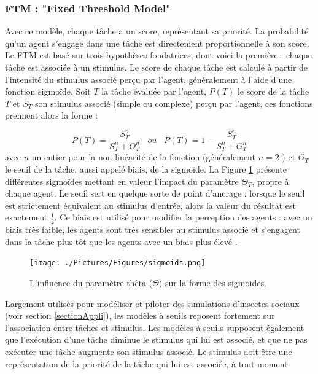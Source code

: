 		\subsubsection{FTM : "Fixed Threshold Model" \cite{bonabeau_natural_1999}}
        Avec ce modèle, chaque tâche a un score, représentant sa priorité. La probabilité qu'un agent s'engage dans une tâche est directement proportionnelle à son score. Le FTM est basé sur trois hypothèses fondatrices, dont voici la première : chaque tâche est associée à un stimulus. Le score de chaque tâche est calculé à partir de l'intensité du stimulus associé perçu par l'agent, généralement à l'aide d'une fonction sigmoïde. Soit $T$ la tâche évaluée par l'agent, $P(T)$ le score de la tâche $T$ et $S_T$ son stimulus associé (simple ou complexe) perçu par l'agent, ces fonctions prennent alors la forme :
			
\begin{equation}
\label{equationSigmoid}
	P(T) = \frac{S_T^n}{S_T^n + \Theta_T^n} \;\;\; ou \;\;\; P(T) = 1 - \frac{S_T^n}{S_T^n + \Theta_T^n}
\end{equation}	
 avec $n$ un entier pour la non-linéarité de la fonction (généralement $n=2$ \cite{schmickl_taskselsim_2008, gautrais_emergent_2002}) et $\Theta_T$ le seuil de la tâche, aussi appelé biais, de la sigmoïde. La Figure \ref{sigmoids} présente différentes sigmoïdes mettant en valeur l'impact du paramètre $\Theta_T$, propre à chaque agent. Le seuil sert en quelque sorte de point d'ancrage : lorsque le seuil est strictement équivalent au stimulus d'entrée, alors la valeur du résultat est exactement $\frac{1}{2}$. Ce biais est utilisé pour modifier la perception des agents : avec un biais très faible, les agents sont très sensibles au stimulus associé et s'engagent dans la tâche plus tôt que les agents avec un biais plus élevé \cite{dornhaus_task_1998}. 
		
		\begin{figure}
		\centering
		\texttt{[image: ./Pictures/Figures/sigmoids.png]}
		\caption{L'influence du paramètre thêta ($\Theta$) sur la forme des sigmoides.}
		\label{sigmoids}
		\end{figure}
        
        Largement utilisés pour modéliser et piloter des simulations d'insectes sociaux (voir section \ref{sectionAppli}), les modèles à seuils reposent fortement sur l'association entre tâches et stimulus. Les modèles à seuils supposent également que l'exécution d'une tâche diminue le stimulus qui lui est associé, et que ne pas exécuter une tâche augmente son stimulus associé. Le stimulus doit être une représentation de la priorité de la tâche qui lui est associée, à tout moment. 
        

